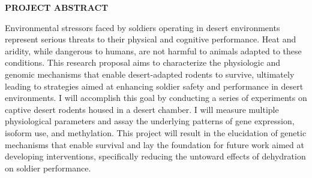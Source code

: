 \documentclass[12pt]{article}
\begin{document}

\setcounter{page}{1}

\begin{center}

 \textbf{PROJECT ABSTRACT} \\

\textsc{}

\end{center}



Environmental stressors faced by soldiers operating in desert environments represent serious threats to their physical and cognitive performance. Heat and aridity, while dangerous to humans, are not harmful to animals adapted to these conditions. This research proposal aims to characterize the physiologic and genomic mechanisms that enable desert-adapted rodents to survive, ultimately leading to strategies aimed at enhancing soldier safety and performance in desert environments. I will accomplish this goal by conducting a series of experiments on captive desert rodents housed in a desert chamber. I will measure multiple physiological parameters and assay the underlying patterns of gene expression, isoform use, and methylation. This project will result in the elucidation of genetic mechanisms that enable survival and lay the foundation for future work aimed at developing interventions, specifically reducing the untoward effects of dehydration on soldier performance.  \\


   
\end{document}
